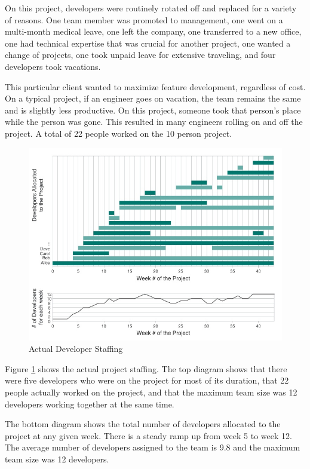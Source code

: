 On this project, developers were routinely rotated off and replaced for a variety of reasons. One team member was promoted to management, one went on a multi-month medical leave, one left the company, one transferred to a new office, one had technical expertise that was crucial for another project, one wanted a change of projects, one took unpaid leave for extensive traveling, and four developers took vacations. 

This particular client wanted to maximize feature development, regardless of cost. On a typical project, if an engineer goes on vacation, the team remains the same and is slightly less productive. On this project, someone took that person's place while the person was gone. This resulted in many engineers rolling on and off the project. A total of 22 people worked on the 10 person project.

\begin{figure}[t]
\centering
\includegraphics[width=7.1in]{DeveloperStaffing.jpg}
\caption{Actual Developer Staffing}
\label{DeveloperStaffing}
\end{figure}

Figure \ref{DeveloperStaffing} shows the actual project staffing.  The top diagram shows that there were five developers who were on the project for most of its duration, that 22 people actually worked on the project, and that the maximum team size was 12 developers working together at the same time.

The bottom diagram shows the total number of developers allocated to the project at any given week. There is a steady ramp up from week 5 to week 12. The average number of developers assigned to the team is 9.8 and the maximum team size was 12 developers.

